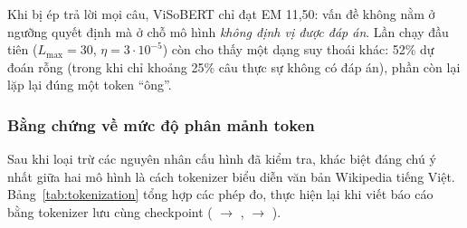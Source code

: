 Khi bị ép trả lời mọi câu, ViSoBERT chỉ đạt EM 11,50: vấn đề không nằm ở ngưỡng quyết định mà ở
chỗ mô hình \emph{không định vị được đáp án}. Lần chạy đầu tiên ($L_{\max} = 30$,
$\eta = 3\cdot10^{-5}$) còn cho thấy một dạng suy thoái khác: 52\% dự đoán rỗng (trong khi chỉ
khoảng 25\% câu thực sự không có đáp án), phần còn lại lặp lại đúng một token ``ông''.

\subsubsection{Bằng chứng về mức độ phân mảnh token}

Sau khi loại trừ các nguyên nhân cấu hình đã kiểm tra, khác biệt đáng chú ý nhất giữa hai mô hình
là cách tokenizer biểu diễn văn bản Wikipedia tiếng Việt. Bảng~\ref{tab:tokenization} tổng hợp
các phép đo, thực hiện lại khi viết báo cáo bằng tokenizer lưu cùng checkpoint
( $\to$ ,
 $\to$ ).

